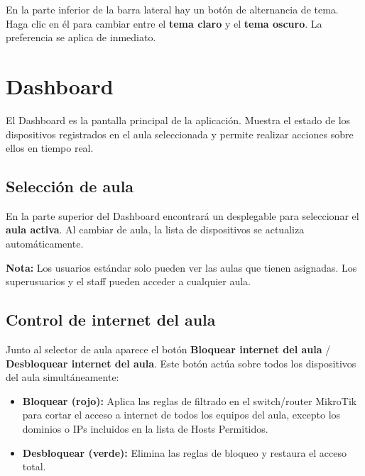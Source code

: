 \documentclass[12pt,a4paper]{article}
\begin{document}
En la parte inferior de la barra lateral hay un botón de alternancia de tema. Haga clic en él para cambiar entre el \textbf{tema claro} y el \textbf{tema oscuro}. La preferencia se aplica de inmediato.

\section{Dashboard}

El Dashboard es la pantalla principal de la aplicación. Muestra el estado de los dispositivos registrados en el aula seleccionada y permite realizar acciones sobre ellos en tiempo real.

\subsection{Selección de aula}

En la parte superior del Dashboard encontrará un desplegable para seleccionar el \textbf{aula activa}. Al cambiar de aula, la lista de dispositivos se actualiza automáticamente.

\begin{infonote}
\textbf{Nota:} Los usuarios estándar solo pueden ver las aulas que tienen asignadas. Los superusuarios y el staff pueden acceder a cualquier aula.
\end{infonote}

\subsection{Control de internet del aula}

Junto al selector de aula aparece el botón \textbf{Bloquear internet del aula} / \textbf{Desbloquear internet del aula}. Este botón actúa sobre todos los dispositivos del aula simultáneamente:

\begin{itemize}
    \item \textbf{Bloquear (rojo):} Aplica las reglas de filtrado en el switch/router MikroTik para cortar el acceso a internet de todos los equipos del aula, excepto los dominios o IPs incluidos en la lista de Hosts Permitidos.
    \item \textbf{Desbloquear (verde):} Elimina las reglas de bloqueo y restaura el acceso total.
\end{itemize}
\end{document}
